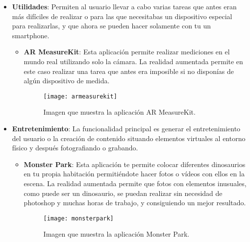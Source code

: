 \begin{itemize}
\begin{itemize}
  \end{itemize}

  \item \textbf{Utilidades}: Permiten al usuario llevar a cabo varias tareas que antes eran más difíciles de realizar o para las que necesitabas un dispositivo especial para realizarlas, y que ahora se pueden hacer solamente con tu un smartphone.

  \begin{itemize}
    \item \textbf{AR MeasureKit}: Esta aplicación permite realizar mediciones en el mundo real utilizando solo la cámara. La realidad aumentada permite en este caso realizar una tarea que antes era imposible si no disponías de algún dispositivo de medida.

    \begin{figure}[h]
      \centering
      \texttt{[image: armeasurekit]}
      \caption{Imagen que muestra la aplicación AR MeasureKit.\protect\footnotemark}
      \label{figura-ar-measurekit}
    \end{figure}

  \end{itemize}

\newpage

  \item \textbf{Entretenimiento}: La funcionalidad principal es generar el entretenimiento del usuario o la creación de contenido situando elementos virtuales al entorno físico y después fotografiando o grabando.

  \begin{itemize}
    \item \textbf{Monster Park}: Esta aplicación te permite colocar diferentes dinosaurios en tu propia habitación permitiéndote hacer fotos o vídeos con ellos en la escena. La realidad aumentada permite que fotos con elementos inusuales, como puede ser un dinosaurio, se puedan realizar sin necesidad de photoshop y muchas horas de trabajo, y consiguiendo un mejor resultado.

    \begin{figure}[h]
      \centering
      \texttt{[image: monsterpark]}
      \caption{Imagen que muestra la aplicación Monster Park.\protect\footnotemark}
      \label{figura-monster-park}
    \end{figure}


\end{itemize}
\end{itemize}
